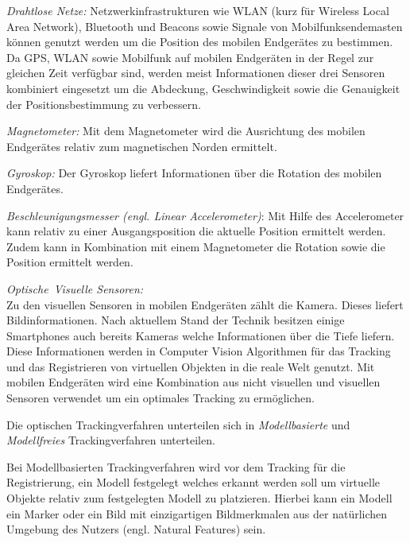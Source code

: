 \textit{Drahtlose Netze:}\cite[S.~101]{DieterSchmalstieg2016} Netzwerkinfrastrukturen wie WLAN (kurz für Wireless Local Area Network), Bluetooth und Beacons sowie Signale von Mobilfunksendemasten können genutzt werden um die Position des mobilen Endgerätes zu bestimmen. 
Da GPS, WLAN sowie Mobilfunk auf mobilen Endgeräten in der Regel zur gleichen Zeit verfügbar sind, werden meist Informationen dieser drei Sensoren kombiniert eingesetzt um die Abdeckung, Geschwindigkeit sowie die
Genauigkeit der Positionsbestimmung zu verbessern. 

\textit{Magnetometer:}\cite[S.~102]{DieterSchmalstieg2016} Mit dem Magnetometer wird die Ausrichtung des mobilen Endgerätes relativ zum magnetischen Norden ermittelt. 

\textit{Gyroskop: } Der Gyroskop liefert Informationen über die Rotation des mobilen Endgerätes. 

\textit{Beschleunigungsmesser (engl. Linear Accelerometer)}:\cite[S.~104]{DieterSchmalstieg2016} Mit Hilfe des Accelerometer kann relativ zu einer Ausgangsposition die aktuelle Position ermittelt werden. Zudem kann in Kombination mit einem Magnetometer
die Rotation sowie die Position ermittelt werden. 

\textit{Optische\ Visuelle Sensoren:}\\

Zu den visuellen Sensoren in mobilen Endgeräten zählt die Kamera. Dieses liefert Bildinformationen. Nach aktuellem Stand der Technik besitzen einige Smartphones auch bereits Kameras welche Informationen über die Tiefe liefern. Diese Informationen werden in Computer Vision Algorithmen für das Tracking und das Registrieren von virtuellen Objekten in die reale Welt genutzt. Mit mobilen Endgeräten wird eine Kombination aus nicht visuellen und visuellen Sensoren verwendet um ein optimales Tracking zu ermöglichen.


Die optischen Trackingverfahren unterteilen sich in \textit{Modellbasierte} und \textit{Modellfreies} Trackingverfahren unterteilen. 

Bei Modellbasierten Trackingverfahren wird vor dem Tracking für die Registrierung, ein Modell festgelegt welches erkannt werden soll um virtuelle Objekte relativ zum festgelegten Modell zu platzieren. 
Hierbei kann ein Modell ein Marker oder ein Bild mit einzigartigen Bildmerkmalen aus der natürlichen Umgebung des Nutzers (engl. Natural Features) sein. 

